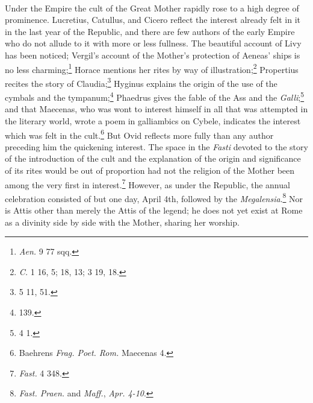 \documentclass[a4paper, 11pt, oneside, polutonikogreek, english]{article}
\begin{document}
\paragraph{}
Under the Empire the cult of the Great Mother rapidly rose to a high degree of prominence. Lucretius, Catullus, and Cicero reflect the interest already felt in it in the last year of the Republic, and there are few authors of the early Empire who do not allude to it with more or less fullness. The beautiful account of Livy has been noticed; Vergil's account of the Mother's protection of Aeneas' ships is no less charming;\footnote{\emph{Aen.} 9 77 sqq.} Horace mentions her rites by way of illustration;\footnote{\emph{C.} 1 16, 5; 18, 13; 3 19, 18.} Propertius recites the story of Claudia;\footnote{5 11, 51.} Hyginus explains the origin of the use of the cymbals and the tympanum;\footnote{139.} Phaedrus gives the fable of the Ass and the \emph{Galli};\footnote{4 1.} and that Maecenas, who was wont to interest himself in all that was attempted in the literary world, wrote a poem in galliambics on Cybele, indicates the interest which was felt in the cult.\footnote{Baehrens \emph{Frag. Poet. Rom.} Maecenas 4.} But Ovid reflects more fully than any author preceding him the quickening interest. The space in the \emph{Fasti} devoted to the story of the introduction of the cult and the explanation of the origin and significance of its rites would be out of proportion had not the religion of the Mother been among the very first in interest.\footnote{\emph{Fast.} 4 348.} However, as under the Republic, the annual celebration consisted of but one day, April 4th, followed by the \emph{Megalensia}.\footnote{\emph{Fast. Praen.} and \emph{Maff.}, \emph{Apr. 4-10}.} Nor is Attis other than merely the Attis of the legend; he does not yet exist at Rome as a divinity side by side with the Mother, sharing her worship.
\end{document}
